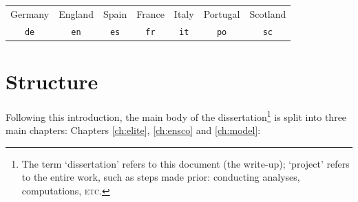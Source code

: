 \documentclass[a4paper,10pt]{report}
\begin{document}
\begin{center}\begin{tabular}{ccccccc}
Germany & England & Spain & France & Italy & Portugal & Scotland \\ 
\lstinline|de| & \lstinline|en| & \lstinline|es| & \lstinline|fr| & \lstinline|it| & \lstinline|po| & \lstinline|sc| 
\end{tabular}\end{center}

\pagebreak

\section{Structure} \label{structure}
Following this introduction, the main body of the dissertation\footnote{The term `dissertation' refers to this document (the write-up); `project' refers to the entire work, such as steps made prior: conducting analyses, computations, \textsc{etc.}} is split into three main chapters: Chapters \ref{ch:elite}, \ref{ch:ensco} and \ref{ch:model}:
\end{document}
